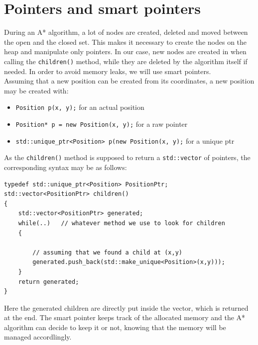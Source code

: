 \documentclass{ecnreport}
\begin{document}
\section{Pointers and smart pointers}\label{smart}

During an A* algorithm, a lot of nodes are created, deleted and moved between the open and the closed set.
This makes it necessary to create the nodes on the heap and manipulate only pointers. 
In our case, new nodes are created in when calling the \texttt{children()} method, while they are deleted by the algorithm
itself if needed. In order to avoid memory leaks, we will use smart pointers.\\

Assuming that a new position can be created from its coordinates, a new position may be created with:
\begin{itemize}
\item \texttt{Position p(x, y);} for an actual position
 \item \texttt{Position* p = new Position(x, y);} for a raw pointer
 \item \texttt{std::unique\_ptr<Position> p(new Position(x, y);} for a unique ptr
\end{itemize}

As the \texttt{children()} method is supposed to return a \texttt{std::vector} of pointers, the corresponding syntax may be as follows:
\begin{center}\cppstyle
\begin{lstlisting}
typedef std::unique_ptr<Position> PositionPtr;
std::vector<PositionPtr> children()
{
    std::vector<PositionPtr> generated;
    while(..)   // whatever method we use to look for children
    {
    
        // assuming that we found a child at (x,y)
        generated.push_back(std::make_unique<Position>(x,y)));
    }
    return generated;
}
\end{lstlisting}
\end{center}
Here the generated children are directly put inside the vector, which is returned at the end. The smart pointer keeps track 
of the allocated memory and the A* algorithm can decide to keep it or not, knowing that the memory will be managed accordlingly.
\end{document}
